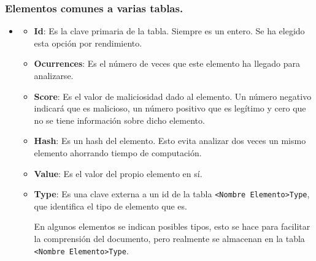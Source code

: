 \subsubsection{Elementos comunes a varias tablas.}
\begin{itemize}
    \item[] 
    \begin{itemize}
        \item \textbf{Id}: Es la clave primaria de la tabla. Siempre es un entero. Se ha elegido esta opción por rendimiento. 
        \item \textbf{Ocurrences}: Es el número de veces que este elemento ha llegado para analizarse.
        \item \textbf{Score}: Es el valor de maliciosidad dado al elemento. Un número negativo indicará que es malicioso, un número positivo que es legítimo y cero que no se tiene información sobre dicho elemento. 
        \item \textbf{Hash}: Es un hash del elemento. Esto evita analizar dos veces un mismo elemento ahorrando tiempo de computación.  
        \item \textbf{Value}: Es el valor del propio elemento en sí.
        \item \textbf{Type}: Es una clave externa a un id de la tabla \verb!<Nombre Elemento>Type!, que identifica el tipo de elemento que es. 
        
        En algunos elementos se indican posibles tipos, esto se hace para facilitar la comprensión del documento, pero realmente se almacenan en la tabla \verb!<Nombre Elemento>Type!.
    \end{itemize}
\end{itemize}

